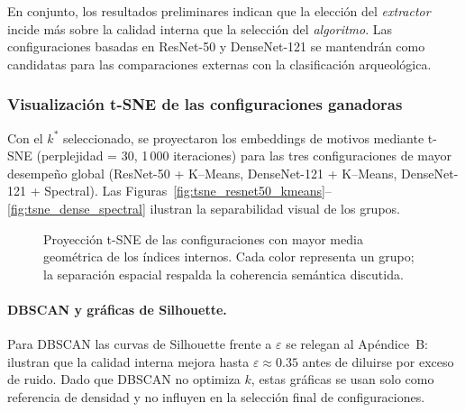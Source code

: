 En conjunto, los resultados preliminares indican que la elección del \emph{extractor} incide más sobre la calidad interna que la selección del \emph{algoritmo}.
Las configuraciones basadas en ResNet-50 y DenseNet-121 se mantendrán como candidatas para las comparaciones externas con la clasificación arqueológica.

\subsubsection{Visualización t-SNE de las configuraciones ganadoras}

Con el $k^\ast$ seleccionado, se proyectaron los embeddings de motivos
mediante t-SNE (perplejidad = 30, 1\,000 iteraciones) para las tres
configuraciones de mayor desempeño global
(ResNet-50 + K–Means, DenseNet-121 + K–Means, DenseNet-121 + Spectral).
Las Figuras~\ref{fig:tsne_resnet50_kmeans}–\ref{fig:tsne_dense_spectral}
ilustran la separabilidad visual de los grupos.

\begin{figure}[htpb]
  \centering
  \hfill
  \hfill

  \caption{Proyección t-SNE de las configuraciones con mayor media
    geométrica de los índices internos. Cada color representa un grupo;
    la separación espacial respalda la coherencia semántica discutida.}%
  \label{fig:tsne_best}
\end{figure}

\vspace{1ex}
\paragraph{DBSCAN y gráficas de Silhouette.}
Para DBSCAN las curvas de Silhouette frente a \(\varepsilon\) se relegan al
Apéndice~B: ilustran que la calidad interna mejora hasta
\(\varepsilon\approx0.35\) antes de diluirse por exceso de ruido.
Dado que DBSCAN no optimiza $k$, estas gráficas se usan solo como referencia
de densidad y no influyen en la selección final de configuraciones.

